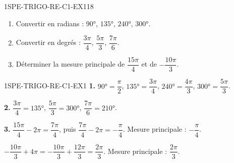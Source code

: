 

\begin{exercice}{1SPE-TRIGO-RE-C1-EX1}{1}{8}
\begin{enumerate}
  \item Convertir en radians : $90°$, $135°$, $240°$, $300°$.
  \item Convertir en degrés : $\dfrac{3\pi}{4}$, $\dfrac{5\pi}{3}$, $\dfrac{7\pi}{6}$.
  \item Déterminer la mesure principale de $\dfrac{15\pi}{4}$ et de $-\dfrac{10\pi}{3}$.
\end{enumerate}
\end{exercice}


\begin{corrige}{1SPE-TRIGO-RE-C1-EX1}
\textbf{1.} $90° = \dfrac{\pi}{2}$, $135° = \dfrac{3\pi}{4}$, $240° = \dfrac{4\pi}{3}$, $300° = \dfrac{5\pi}{3}$.

\textbf{2.} $\dfrac{3\pi}{4} = 135°$, $\dfrac{5\pi}{3} = 300°$, $\dfrac{7\pi}{6} = 210°$.

\textbf{3.} $\dfrac{15\pi}{4} - 2\pi = \dfrac{7\pi}{4}$, puis $\dfrac{7\pi}{4} - 2\pi = -\dfrac{\pi}{4}$. Mesure principale : $-\dfrac{\pi}{4}$.

$-\dfrac{10\pi}{3} + 4\pi = -\dfrac{10\pi}{3} + \dfrac{12\pi}{3} = \dfrac{2\pi}{3}$. Mesure principale : $\dfrac{2\pi}{3}$.
\end{corrige}
